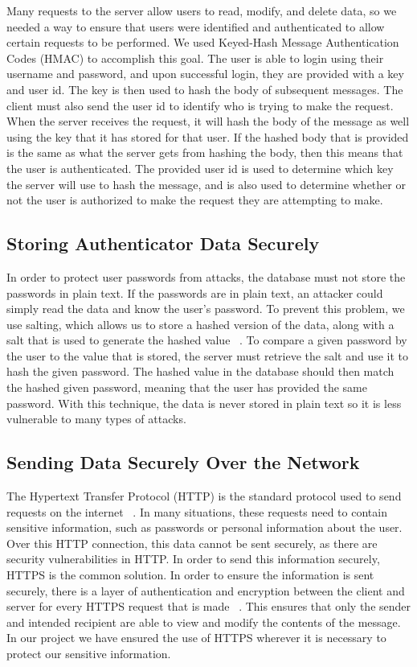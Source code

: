 \documentclass[12pt]{report}
\let\Oldsubsection\subsection
\renewcommand{\subsection}{\FloatBarrier\Oldsubsection}
\begin{document}
Many requests to the server allow users to read, modify, and delete data, so we needed a
way to ensure that users were identified and authenticated to allow certain requests to be
performed. We used Keyed-Hash Message Authentication Codes (HMAC) to accomplish this goal.
The user is able to login using their username and password, and upon successful login, they are
provided with a key and user id. The key is then used to hash the body of subsequent messages. 
The client must also send the user id to identify who is trying to
make the request. When the server receives the request, it will hash the body of the message as
well using the key that it has stored for that user. If the hashed body that is provided is the same
as what the server gets from hashing the body, then this means that the user is authenticated. The
provided user id is used to determine which key the server will use to hash the message, and is
also used to determine whether or not the user is authorized to make the request they are
attempting to make.

\subsection{Storing Authenticator Data Securely} \label{storing-authenticator-data-securely}

In order to protect user passwords from attacks, the database must not store the
passwords in plain text. If the passwords are in plain text, an attacker could simply read the data
and know the user’s password. To prevent this problem, we use salting, which allows us to store a 
hashed version of the data, along with a salt that is
used to generate the hashed value ~\autocite{PASSWORDSALTING}. To compare a given password by the user to the value that is
stored, the server must retrieve the salt and use it to hash the given password. The hashed value
in the database should then match the hashed given password, meaning that the user has provided
the same password. With this technique, the data is never stored in plain text so it is less
vulnerable to many types of attacks.

\subsection{Sending Data Securely Over the Network} \label{sending-data-securely-over-the-network}

The Hypertext Transfer Protocol (HTTP) is the standard protocol used to send requests on the internet ~\autocite{HTTPREF}.
In many situations, these requests need to contain sensitive information, such as passwords or personal
information about the user. Over this HTTP connection, this data cannot be sent securely, as there are
security vulnerabilities in HTTP. In order to send this information securely, HTTPS is the common
solution. In order to ensure the information is sent securely, there is a layer of authentication
and encryption between the client and server for every HTTPS request that is made ~\autocite{HTTPSVSHTTP}. This ensures that
only the sender and intended recipient are able to view and modify the contents of the message. In our
project we have ensured the use of HTTPS wherever it is necessary to protect our sensitive information.
\end{document}
